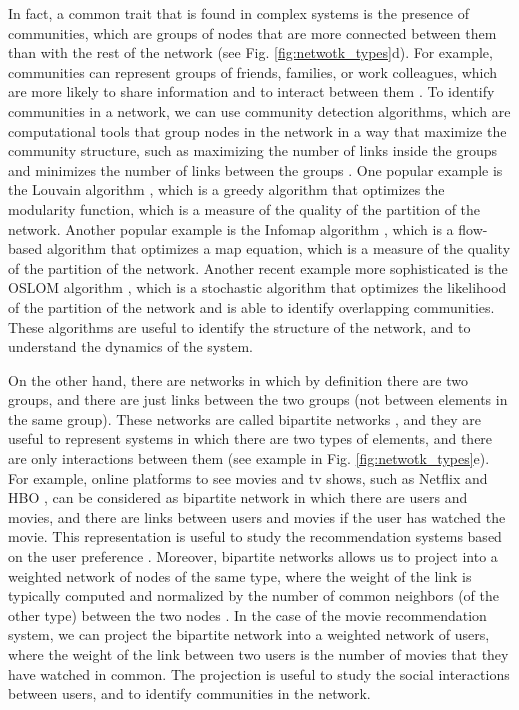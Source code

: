 In fact, a common trait that is found in complex systems is the presence of communities, which are groups of nodes that are more connected between them than with the rest of the network \cite{girvan-2002} (see Fig. \ref{fig:netwotk_types}d). For example, communities can represent groups of friends, families, or work colleagues, which are more likely to share information and to interact between them \cite{newman2001structure}. To identify communities in a network, we can use community detection algorithms, which are computational tools that group nodes in the network in a way that maximize the community structure, such as maximizing the number of links inside the groups and minimizes the number of links between the groups \cite{lancichinetti-2008,fortunato2010community}. One popular example is the Louvain algorithm \cite{blondel-2008}, which is a greedy algorithm that optimizes the modularity function, which is a measure of the quality of the partition of the network. Another popular example is the Infomap algorithm \cite{rosvall-2008}, which is a flow-based algorithm that optimizes a map equation, which is a measure of the quality of the partition of the network. Another recent example more sophisticated is the OSLOM algorithm \cite{OSLOM}, which is a stochastic algorithm that optimizes the likelihood of the partition of the network and is able to identify overlapping communities. These algorithms are useful to identify the structure of the network, and to understand the dynamics of the system.

On the other hand, there are networks in which by definition there are two groups, and there are just links between the two groups (not between elements in the same group). These networks are called bipartite networks \cite{newman2001structure}, and they are useful to represent systems in which there are two types of elements, and there are only interactions between them \cite{latapy-2008} (see example in Fig. \ref{fig:netwotk_types}e). For example, online platforms to see movies and tv shows, such as Netflix \cite{netflix} and HBO \cite{HBO}, can be considered as bipartite network in which there are users and movies, and there are links between users and movies if the user has watched the movie. This representation is useful to study the recommendation systems based on the user preference \cite{ricci-2011}. Moreover, bipartite networks allows us to project into a weighted network of nodes of the same type, where the weight of the link is typically computed and normalized by the number of common neighbors (of the other type) between the two nodes \cite{newman-2001-collaboration}. In the case of the movie recommendation system, we can project the bipartite network into a weighted network of users, where the weight of the link between two users is the number of movies that they have watched in common. The projection is useful to study the social interactions between users, and to identify communities in the network.

